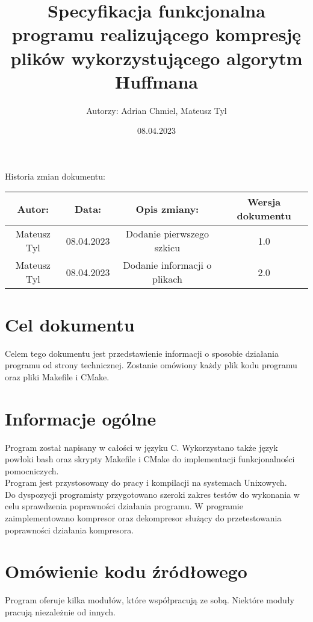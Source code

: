 \documentclass[]{article}
\title{Specyfikacja funkcjonalna programu realizującego kompresję plików wykorzystującego algorytm Huffmana}
\author{Autorzy: Adrian Chmiel, Mateusz Tyl}
\date{08.04.2023}
\begin{document}
\maketitle
\begin{center}
Historia zmian dokumentu:\\
\end{center}

\begin{tabular}{|c|c|c|c|}
  \hline 
  Autor: & Data: & Opis zmiany:& Wersja dokumentu \\
  \hline
  Mateusz Tyl & 08.04.2023 & Dodanie pierwszego szkicu & 1.0 \\
\hline
  Mateusz Tyl & 08.04.2023 & Dodanie informacji o plikach & 2.0 \\
\end{tabular} 
\section{Cel dokumentu}\label{header-n231}

Celem tego dokumentu jest przedstawienie informacji o sposobie działania programu od strony technicznej. Zostanie omówiony każdy plik kodu programu oraz pliki Makefile i CMake.
\section{Informacje ogólne}\label{header-n231}
Program został napisany w całości w języku C. Wykorzystano także język powłoki bash oraz skrypty Makefile i CMake do implementacji funkcjonalności pomocniczych.\\
Program jest przystosowany do pracy i kompilacji na systemach Unixowych.\\
Do dyspozycji programisty przygotowano szeroki zakres testów do wykonania w celu sprawdzenia poprawności działania programu.
W programie zaimplementowano kompresor oraz dekompresor służący do przetestowania poprawności działania kompresora.

\section{Omówienie kodu źródłowego}\label{header-n231}
Program oferuje kilka modułów, które współpracują ze sobą. Niektóre moduły pracują niezależnie od innych.
\end{document}
